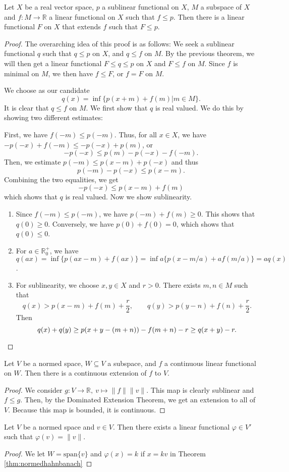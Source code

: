 \documentclass[twoside,symmetric, openany, 12pt]{./tuftebook}
\theoremstyle{definition}
\theoremstyle{definition}
\theoremstyle{definition}
\newcommand{\R}{\mathbb{R}}
\begin{document}
	\begin{Theorem}
	Let $X$ be a real vector space, $p$ a sublinear functional on $X$, $M$ a subspace of $X$ and $f:M \to \R$ a linear functional on $X$ such that $f \le p$. Then there is a linear functional $F$ on $X$ that extends $f$ such that $F \le p$.
	\end{Theorem}
	\begin{proof}
	The overarching idea of this proof is as follows: We seek a sublinear functional $q$ such that $q\le p$ on $X$, and $q \le f$ on $M$. By the previous theorem, we will then get a linear functional $F \le q \le p$ on $X$ and $F \le f$ on $M$. Since $f$ is minimal on $M$, we then have $f \le F$, or $f=F$ on $M$.
	
	We choose as our candidate
	\[
	q(x)=\inf \{p(x+m)+f(m)|m \in M \} 
	.\] 
	It is clear that $q\le f$ on $M$. We first show that $q$ is real valued. We do this by showing two different estimates:
	
	First, we have $f(-m)\le p(-m)$. Thus, for all $x\in X$, we have $-p(-x)+f(-m)\le -p(-x)+p(m)$, or
	\[
	-p(-x)\le p(m)-p(-x)-f(-m)
	.\] 
	Then, we estimate $p(-m)\le p(x-m) + p(-x)$ and thus
	\[p(-m)-p(-x)\le p(x-m).\]
	Combining the two equalities, we get
	\[
	-p(-x)\le p(x-m)+f(m)
	\]
	which shows that $q$ is real valued. Now we show sublinearity.
	\begin{enumerate}
		\item Since $f(-m) \le p(-m)$, we have $p(-m)+f(m)\ge 0$. This shows that $q(0)\ge 0$. Conversely, we have $p(0)+f(0)=0$, which shows that $q(0)\le 0$. 
		\item For $a\in \R_0^+$, we have $q(ax)=\inf \{p(ax-m)+f(ax)\} =\inf a\{p(x - m / a)+a f(m / a)\} = aq(x)$.
		\item For sublinearity, we choose $x,y\in X$ and $r>0$. There exists $m,n\in M$ such that
			\[
			q(x)>p(x-m)+f(m)+\frac{r}{2},\qquad q(y)>p(y-n)+f(n)+\frac{r}{2}
			.\] 
			Then
			\[
			q(x)+q(y)\ge p(x+y-(m+n)) - f(m+n) - r\ge q(x+y)-r
			.\qedhere\] 
	\end{enumerate}
	\end{proof}
	\begin{Theorem}\label{thm:normedhahnbanach}
		Let $V$ be a normed space, $W\subseteq V$ a subspace, and $f$ a continuous linear functional on $W$. Then there is a continuous extension of $f$ to $V$.
\end{Theorem}
\begin{proof}
	We consider $g: V \to \R,~v\mapsto \|f\| \|v\|$. This map is clearly sublinear and $f \le g$. Then, by the Dominated Extension Theorem, we get an extension to all of $V$. Because this map is bounded, it is continuous.
\end{proof}
\begin{Corollary}\label{cor:hahnbanachsubspace}
	Let $ V$ be a normed space and $v\in V$. Then there exists a linear functional $\varphi \in V'$ such that $\varphi(v)=\|v\|$.
\end{Corollary}
\begin{proof}
	We let $W=\text{span}\{v\} $ and $\varphi(x)=k$ if $x=kv$ in Theorem \ref{thm:normedhahnbanach}
\end{proof}
\end{document}
